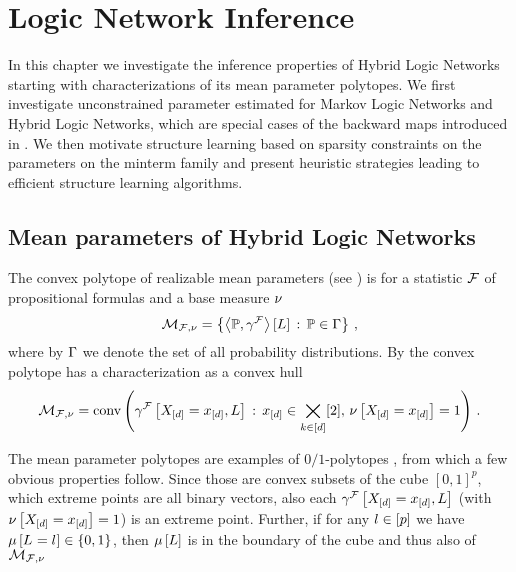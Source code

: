 \section{Logic Network Inference}\label{cha:networkReasoning}

In this chapter we investigate the inference properties of Hybrid Logic Networks starting with characterizations of its mean parameter polytopes.
We first investigate unconstrained parameter estimated for Markov Logic Networks and Hybrid Logic Networks, which are special cases of the backward maps introduced in .
We then motivate structure learning based on sparsity constraints on the parameters on the minterm family and present heuristic strategies leading to efficient structure learning algorithms.

\subsection{Mean parameters of Hybrid Logic Networks}

The convex polytope of realizable mean parameters (see ) is for a statistic $\mathcal{F}$ of propositional formulas and a base measure $\nu$
	\[ \mathcal{M}_{\mathcal{F},\nu} = \left\{ \left\langle \mathbb{P},\gamma^{\mathcal{F}}\right\rangle \left[ L \right] \, : \, \mathbb{P}\in\Gamma \right\} \, ,\]
where by $\Gamma$ we denote the set of all probability distributions.
By  the convex polytope has a characterization as a convex hull
\begin{align}\label{eq:hlnMeansetConvCharacterization}
	\mathcal{M}_{\mathcal{F},\nu}
	= \mathrm{conv}\left(\gamma^{\mathcal{F}}\left[X_{[d]}=x_{[d]},L\right] \, : \, x_{[d]}\in\bigtimes_{k\in[d]}[2], \, \nu\left[X_{[d]}=x_{[d]}\right]=1\right) \, . 
\end{align}

The mean parameter polytopes are examples of $0/1$-polytopes \cite{ziegler_lectures_2000,gillmann_01-polytopes_2007}, from which a few obvious properties follow.
Since those are convex subsets of the cube $[0,1]^p$, which extreme points are all binary vectors, also each $\gamma^{\mathcal{F}}\left[X_{[d]}=x_{[d]},L\right]$ (with $\nu\left[X_{[d]}=x_{[d]}\right]=1$) is an extreme point.
Further, if for any $l\in[p]$ we have $\mu\left[L_{}=l_{}\right]\in\{0,1\}$, then $\mu\left[L\right]$ is in the boundary of the cube and thus also of $\mathcal{M}_{\mathcal{F},\nu}$


